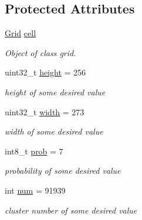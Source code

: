 \subsection*{Protected Attributes}
\begin{DoxyCompactItemize}
\item 
\hyperlink{classGrid}{Grid} \hyperlink{classGridTest_abe41b4d65a445d95a553340f81966e5e}{cell}\hypertarget{classGridTest_abe41b4d65a445d95a553340f81966e5e}{}\label{classGridTest_abe41b4d65a445d95a553340f81966e5e}

\begin{DoxyCompactList}\small\item\em Object of class grid. \end{DoxyCompactList}\item 
uint32\+\_\+t \hyperlink{classGridTest_a514f785a55501fbe6009437bda8fe696}{height} = 256\hypertarget{classGridTest_a514f785a55501fbe6009437bda8fe696}{}\label{classGridTest_a514f785a55501fbe6009437bda8fe696}

\begin{DoxyCompactList}\small\item\em height of some desired value \end{DoxyCompactList}\item 
uint32\+\_\+t \hyperlink{classGridTest_a6fe65931252af9de0ff6e9f9699c1a85}{width} = 273\hypertarget{classGridTest_a6fe65931252af9de0ff6e9f9699c1a85}{}\label{classGridTest_a6fe65931252af9de0ff6e9f9699c1a85}

\begin{DoxyCompactList}\small\item\em width of some desired value \end{DoxyCompactList}\item 
int8\+\_\+t \hyperlink{classGridTest_a1bb24df4835b135fd13bef6c40744c8a}{prob} = 7\hypertarget{classGridTest_a1bb24df4835b135fd13bef6c40744c8a}{}\label{classGridTest_a1bb24df4835b135fd13bef6c40744c8a}

\begin{DoxyCompactList}\small\item\em probability of some desired value \end{DoxyCompactList}\item 
int \hyperlink{classGridTest_a79d9337fb35b39b4f49365293947c407}{num} = 91939\hypertarget{classGridTest_a79d9337fb35b39b4f49365293947c407}{}\label{classGridTest_a79d9337fb35b39b4f49365293947c407}

\begin{DoxyCompactList}\small\item\em cluster number of some desired value \end{DoxyCompactList}\end{DoxyCompactItemize}


